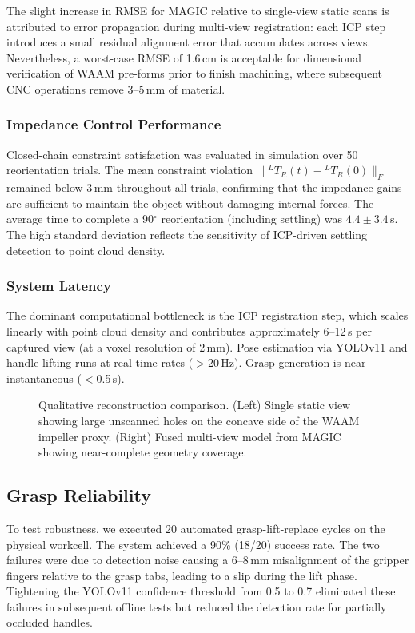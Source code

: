 \documentclass[letterpaper, 10 pt, conference]{ieeeconf}  %
\begin{document}
The slight increase in RMSE for MAGIC relative to single-view static scans is
attributed to error propagation during multi-view registration: each ICP step
introduces a small residual alignment error that accumulates across views.
Nevertheless, a worst-case RMSE of 1.6\,cm is acceptable for dimensional
verification of WAAM pre-forms prior to finish machining, where subsequent CNC
operations remove 3--5\,mm of material.

\subsubsection{Impedance Control Performance}

Closed-chain constraint satisfaction was evaluated in simulation over 50
reorientation trials. The mean constraint violation $\|{^{L}T_R(t)} -
{^{L}T_R(0)}\|_F$ remained below 3\,mm throughout all trials, confirming that
the impedance gains are sufficient to maintain the object without damaging
internal forces. The average time to complete a 90$^\circ$ reorientation
(including settling) was $4.4 \pm 3.4$\,s. The high standard deviation
reflects the sensitivity of ICP-driven settling detection to point cloud
density.

\subsubsection{System Latency}

The dominant computational bottleneck is the ICP registration step, which
scales linearly with point cloud density and contributes approximately
6--12\,s per captured view (at a voxel resolution of 2\,mm). Pose estimation
via YOLOv11 and handle lifting runs at real-time rates ($>$20\,Hz). Grasp
generation is near-instantaneous ($<$0.5\,s).

\begin{figure}[thpb]
   \centering
   \framebox{\parbox{3in}{}}
   \caption{Qualitative reconstruction comparison. (Left) Single static view
   showing large unscanned holes on the concave side of the WAAM impeller
   proxy. (Right) Fused multi-view model from MAGIC showing near-complete
   geometry coverage.}
   \label{fig:qualitative}
\end{figure}

\subsection{Grasp Reliability}

To test robustness, we executed 20 automated grasp-lift-replace cycles on the
physical workcell. The system achieved a 90\% (18/20) success rate. The two
failures were due to detection noise causing a 6--8\,mm misalignment of the
gripper fingers relative to the grasp tabs, leading to a slip during the
lift phase. Tightening the YOLOv11 confidence threshold from 0.5 to 0.7
eliminated these failures in subsequent offline tests but reduced the
detection rate for partially occluded handles.
\end{document}
